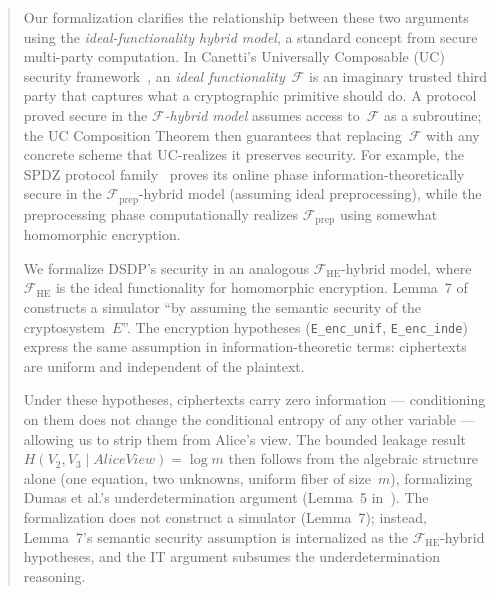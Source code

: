 \documentclass{article}
\begin{document}
\begin{quote}
  Our formalization clarifies the relationship between these two arguments using the \emph{ideal-functionality hybrid model}, a standard concept from secure multi-party computation. In Canetti's Universally Composable (UC) security framework~\cite{Canetti2001,Canetti2020}, an \emph{ideal functionality}~$\mathcal{F}$ is an imaginary trusted third party that captures what a cryptographic primitive should do. A protocol proved secure in the \emph{$\mathcal{F}$-hybrid model} assumes access to~$\mathcal{F}$ as a subroutine; the UC Composition Theorem then guarantees that replacing~$\mathcal{F}$ with any concrete scheme that UC-realizes it preserves security. For example, the SPDZ protocol family~\cite{SPDZ2012springer} proves its online phase information-theoretically secure in the $\mathcal{F}_{\mathrm{prep}}$-hybrid model (assuming ideal preprocessing), while the preprocessing phase computationally realizes $\mathcal{F}_{\mathrm{prep}}$ using somewhat homomorphic encryption.

  We formalize DSDP's security in an analogous $\mathcal{F}_{\mathrm{HE}}$-hybrid model,
  where $\mathcal{F}_{\mathrm{HE}}$ is the ideal functionality for homomorphic encryption.
  Lemma~7 of~\cite{dumas2017dual} constructs a simulator ``by assuming the semantic security of the cryptosystem~$E$''.
  The encryption hypotheses (\texttt{E\_enc\_unif}, \texttt{E\_enc\_inde}) express the same assumption in information-theoretic terms: ciphertexts are uniform and independent of the plaintext.
  
  Under these hypotheses, ciphertexts carry zero information
  --- conditioning on them does not change the conditional entropy of any other variable --- allowing us to strip them from Alice's view.
  The bounded leakage result $H(V_2, V_3 \mid \mathit{AliceView}) = \log m$ then follows from the algebraic structure alone (one equation, two unknowns, uniform fiber of size~$m$), formalizing Dumas et al.'s underdetermination argument (Lemma~5 in~\cite{dumas2017dual}). The formalization does not construct a simulator (Lemma~7); instead, Lemma~7's semantic security assumption is internalized as the $\mathcal{F}_{\mathrm{HE}}$-hybrid hypotheses, and the IT argument subsumes the underdetermination reasoning.
\end{quote}



\end{document}
